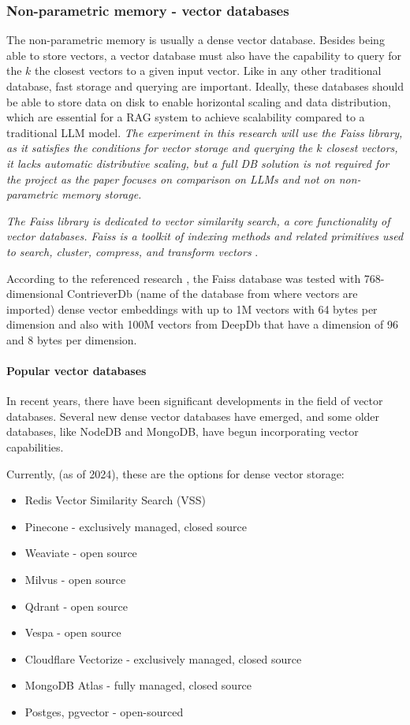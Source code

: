 \documentclass{wseas}
\begin{document}
\subsubsection{Non-parametric memory - vector databases}

The non-parametric memory is usually a dense vector database. Besides
being able to store vectors, a vector database must also have the
capability to query for the $k$ the closest vectors to a given input
vector. Like in any other traditional database, fast storage and querying 
are important. Ideally, these databases should be able to store data on 
disk to enable horizontal scaling and data distribution, which are essential 
for a RAG system to achieve scalability compared to a traditional LLM model.
\textit{
The experiment in this research will use the Faiss library, as it satisfies the conditions for
vector storage and querying the $k$ closest vectors, it lacks automatic
distributive scaling, but a full DB solution is not required for the project as the paper
focuses on comparison on LLMs and not on non-parametric memory storage.}

\emph{The Faiss library is dedicated to vector similarity search, a core
functionality of vector databases. Faiss is a toolkit of indexing
methods and related primitives used to search, cluster, compress, and
transform vectors} \cite{the_faiss_library}.

According to the referenced research \cite{the_faiss_library}, the Faiss database 
was tested with 768-dimensional ContrieverDb (name of the database from where vectors
are imported) dense vector embeddings with up to 1M vectors with 64
bytes per dimension and also with 100M vectors from DeepDb that have a
dimension of 96 and 8 bytes per dimension.

\paragraph{Popular vector databases}

In recent years, there have been significant developments in the field
of vector databases. Several new dense vector databases have emerged,
and some older databases, like NodeDB and MongoDB, have begun
incorporating vector capabilities.

Currently, (as of 2024), these are the options for dense vector storage:

\begin{itemize}
\item
  Redis Vector Similarity Search (VSS)
\item
  Pinecone - exclusively managed, closed source
\item
  Weaviate - open source
\item
  Milvus - open source
\item
  Qdrant - open source
\item
  Vespa - open source
\item
  Cloudflare Vectorize - exclusively managed, closed source
\item
  MongoDB Atlas - fully managed, closed source
\item
  Postges, pgvector - open-sourced
\end{itemize}
\end{document}
